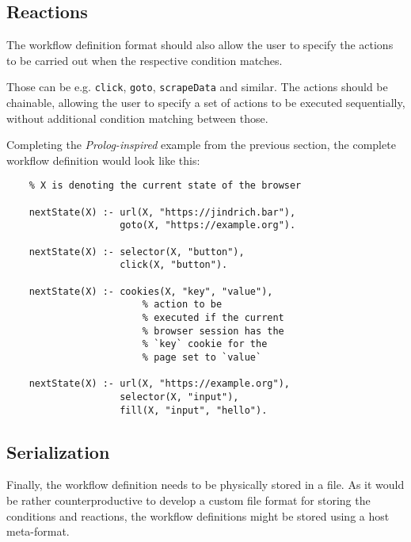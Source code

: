 \subsection{Reactions}

The workflow definition format should also allow the user to specify the actions to be carried out when the respective condition matches.

Those can be e.g. \texttt{click}, \texttt{goto}, \texttt{scrapeData} and similar. 
The actions should be chainable, allowing the user to specify a set of actions to be executed sequentially, without additional condition matching between those.

Completing the \textit{Prolog-inspired} example from the previous section, the complete workflow definition would look like this:

\begin{minipage}{0.95\linewidth}
\begin{verbatim}
    % X is denoting the current state of the browser

    nextState(X) :- url(X, "https://jindrich.bar"),
                    goto(X, "https://example.org").
    
    nextState(X) :- selector(X, "button"),
                    click(X, "button").
    
    nextState(X) :- cookies(X, "key", "value"),
                        % action to be 
                        % executed if the current 
                        % browser session has the
                        % `key` cookie for the  
                        % page set to `value`
    
    nextState(X) :- url(X, "https://example.org"),
                    selector(X, "input"),
                    fill(X, "input", "hello").
\end{verbatim}
\end{minipage}

\subsection{Serialization}


Finally, the workflow definition needs to be physically stored in a file. 
As it would be rather counterproductive to develop a custom file format for storing the conditions and reactions, the workflow definitions might be stored using a host meta-format.

